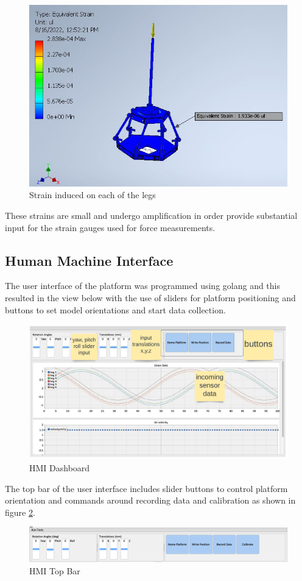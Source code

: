 \begin{center}
	\begin{figure}[H]
		\centering
		\includegraphics[width=0.6\linewidth]{Figures/Equivalent}
		\caption[Equivalent strain]{Strain induced on each of the legs}
		\label{strain1}
	\end{figure}
\end{center}
These strains are small and undergo amplification in order provide substantial input for the strain gauges used for force measurements.

\subsection{Human Machine Interface}
The user interface of the platform was programmed using golang and this resulted in the view below with the use of sliders for platform positioning and buttons to set model orientations and start data collection.
\begin{center}
	\begin{figure}[H]
		\centering
		\includegraphics[width=1\linewidth]{Figures/hmi}
		\caption[HMI Dashboard]{HMI Dashboard}
	\end{figure}
\end{center}

The top bar of the user interface includes slider buttons to control platform orientation and commands around recording data and calibration as shown in figure \ref{fig:hmi_top}.
\begin{center}
	\begin{figure}[H]
		\centering
		\includegraphics[width=1\linewidth]{Figures/Screenshot 2022-12-11 195125.png}
		\caption[HMI Top Bar]{HMI Top Bar}
		\label{fig:hmi_top}
	\end{figure}
\end{center}

